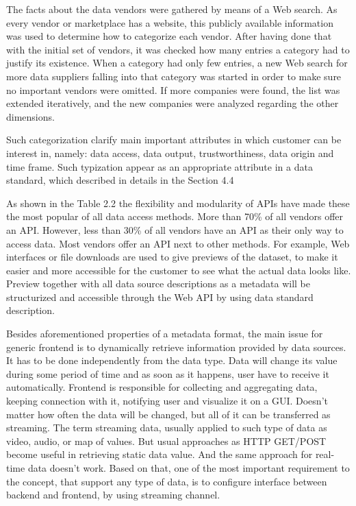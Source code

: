 	The facts about the data vendors were gathered by means of a Web search. As every vendor or marketplace has a website, this publicly available information was used to determine how to categorize each vendor. After having done that with the initial set of vendors, it was checked how many entries a category had to justify its existence. When a category had only few entries, a new Web search for more data suppliers falling into that category was started in order to make sure no important vendors were omitted. If more companies were found, the list was extended iteratively, and the new companies were analyzed regarding the other dimensions.

	Such categorization clarify main important attributes in which customer can be interest in, namely: data access, data output, trustworthiness, data origin and time frame. Such typization appear as an appropriate attribute in a data standard, which described in details in the Section 4.4

	As shown in the Table 2.2 the flexibility and modularity of APIs have made these the most popular of all data access methods. More than 70\% of all vendors offer an API. However, less than 30\% of all vendors have an API as their only way to access data. Most vendors offer an API next to other methods. For example, Web interfaces or file downloads are used to give previews of the dataset, to make it easier and more accessible for the customer to see what the actual data looks like. Preview together with all data source descriptions as a metadata will be structurized and accessible through the Web API by using data standard description.

	Besides aforementioned properties of a metadata format, the main issue for generic frontend is to dynamically retrieve information provided by data sources. It has to be done independently from the data type. Data will change its value during some period of time and as soon as it happens, user have to receive it automatically. Frontend is responsible for collecting and aggregating data, keeping connection with it, notifying user and visualize it on a GUI. Doesn't matter how often the data will be changed, but all of it can be transferred as streaming. The term streaming data, usually applied to such type of data as video, audio, or map of values. But usual approaches as HTTP GET/POST become useful in retrieving static data value. And the same approach for real-time data doesn't work. Based on that, one of the most important requirement to the concept, that support any type of data, is to configure interface between backend and frontend, by using streaming channel. 

